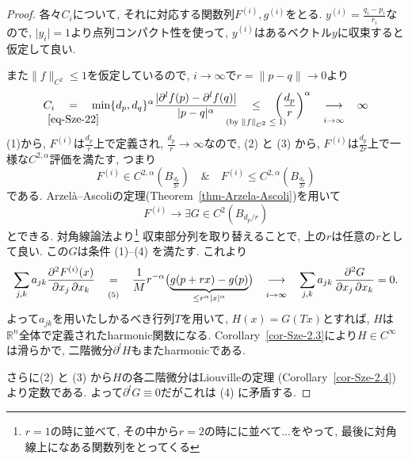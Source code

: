 \documentclass[dvipdfmx,a4paper,11pt]{article} %
\theoremstyle{definition}
\theoremstyle{remark}
\numberwithin{equation}{section}
\newcommand{\underalign}[2]{%
  \quad
  \underset{\mathclap{\raisebox{-1.6ex}{\ensuremath{\scriptstyle #1}}}}{#2}
  \quad
}
\begin{document}
\begin{proof}
各々$C_i$について, それに対応する関数列$F^{(i)}, g^{(i)}$をとる. 
$y^{(i)} = \frac{q_i-p_i}{r_i}$なので, $\lvert y_i\rvert=1$より点列コンパクト性を使って, 
$y^{(i)}$はあるベクトル$y$に収束すると仮定して良い. 



また$\lVert f\rVert_{C^2}\leq 1$を仮定しているので, $i \to \infty$で$r=\lVert p - q\rVert \longrightarrow 0$より
\[
C_i
\underalign{\eqref{eq-Sze-22}}{=}
\min\{d_p,d_q\}^\alpha\frac{\lvert\partial^l f(p)-\partial^l f(q)\rvert}{\lvert p-q\rvert^\alpha}
\underalign{\text{(by $\lVert f\rVert_{C^2}\leq 1$)}}{\leq}
\left(\frac{d_p}{r}\right)^{\alpha} 
\underalign{i \to \infty}{\longrightarrow}
 \infty
\]
(1)から, $F^{(i)}$は$\frac{d_p}{r}$上で定義され, $\frac{d_p}{r}\to \infty$なので, 
 (2) と (3) から, $F^{(i)}$は$\frac{d_p}{2r}$上で一様な$C^{2,\alpha}$評価を満たす, 
 つまり
 \[
 F^{(i)} \in C^{2,\alpha}(B_{\frac{d_p}{2r}})
 \quad 
 \&
 \quad
 F^{(i)} \leq C^{2,\alpha}(B_{\frac{d_p}{2r}})
 \]
 である. 
Arzel\`a--Ascoliの定理(Theorem~\ref{thm-Arzela-Ascoli})を用いて
\[
 F^{(i)} 
  \to \exists G \in C^{2}(B_{d_p/r})
\]
とできる. 
対角線論法より\footnote{$r=1$の時に並べて, その中から$r=2$の時にに並べて...をやって, 最後に対角線上になある関数列をとってくる}
収束部分列を取り替えることで, 
上の$r$は任意の$r$として良い. 
この$G$は条件 (1)--(4) を満たす.
これより
\[
\sum_{j,k} 
a_{jk}\frac{\partial^2  F^{(i)} (x)}{\partial x_j\,\partial x_k}
\underalign{(5)}{=}
\frac{1}{M}r^{-\alpha}\bigl(\underbrace{g(p+rx)-g(p)}_{\le r^{\alpha}|x|^{\alpha}}\bigr)
\underalign{i \to \infty}{\longrightarrow}
\sum_{j,k} a_{jk}\,\frac{\partial^2 G}{\partial x_j\,\partial x_k}=0.
\]
よって$a_{jk}$を用いたしかるべき行列$T$を用いて, 
$H(x)=G(Tx)$とすれば, $H$は$\mathbb R^n$全体で定義されたharmonic関数になる. 
Corollary~\ref{cor-Sze-2.3}により$H \in C^\infty$は滑らかで, 二階微分$\partial^l H$もまたharmonicである.

さらに(2) と (3) から$H$の各二階微分はLiouvilleの定理 (Corollary~\ref{cor-Sze-2.4})より定数である. 
よって$\partial^l G \equiv 0$だがこれは (4) に矛盾する.
\end{proof}
\end{document}
